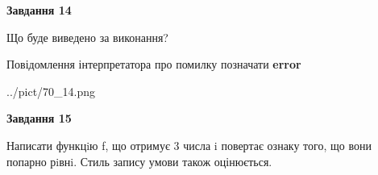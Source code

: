 \documentclass[11pt, ukrainian]{article}
\begin{document}
{\begin {large}
{\begin {center}\textbf{Завдання 14}\end {center}}\par
Що буде виведено за виконання? \par
Повідомлення інтерпретатора про помилку позначати \textbf{error}

\begin{center}
	{../pict/70_14.png}
\end{center}
\newpage

{\begin {center}\textbf{Завдання 15}\end {center}}\par

Написати функцiю f, що отримує 3 числа i повертає ознаку того, що вони попарно рiвнi. Стиль запису умови також оцінюється.\par
\newpage

\end {large}}
\end{document}
